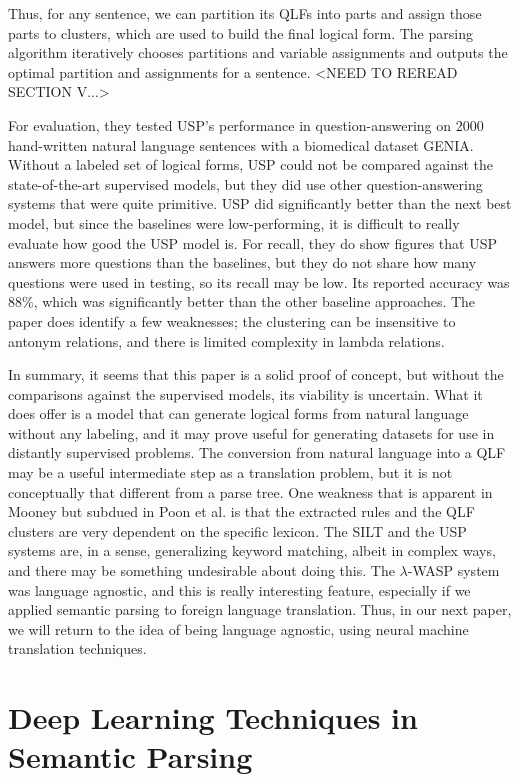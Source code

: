 \documentclass[a4paper]{article}
\theoremstyle{definition}
\begin{document}
\quad Thus, for any sentence, we can partition its QLFs into parts and assign those parts to clusters, which are used to build the final logical form. The parsing algorithm iteratively chooses partitions and variable assignments and outputs the optimal partition and assignments for a sentence. <NEED TO REREAD SECTION V...>

\quad For evaluation, they tested USP's performance in question-answering on $2000$ hand-written natural language sentences with a biomedical dataset GENIA. Without a labeled set of logical forms, USP could not be compared against the state-of-the-art supervised models, but they did use other question-answering systems that were quite primitive. USP did significantly better than the next best model, but since the baselines were low-performing, it is difficult to really evaluate how good the USP model is. For recall, they do show figures that USP answers more questions than the baselines, but they do not share how many questions were used in testing, so its recall may be low. Its reported accuracy was $88\%$, which was significantly better than the other baseline approaches. The paper does identify a few weaknesses; the clustering can be insensitive to antonym relations, and there is limited complexity in lambda relations.

\quad In summary, it seems that this paper is a solid proof of concept, but without the comparisons against the supervised models, its viability is uncertain. What it does offer is a model that can generate logical forms from natural language without any labeling, and it may prove useful for generating datasets for use in distantly supervised problems. The conversion from natural language into a QLF may be a useful intermediate step as a translation problem, but it is not conceptually that different from a parse tree. One weakness that is apparent in Mooney but subdued in Poon et al. is that the extracted rules and the QLF clusters are very dependent on the specific lexicon. The SILT and the USP systems are, in a sense, generalizing keyword matching, albeit in complex ways, and there may be something undesirable about doing this. The $\lambda$-WASP system was language agnostic, and this is really interesting feature, especially if we applied semantic parsing to foreign language translation. Thus, in our next paper, we will return to the idea of being language agnostic, using neural machine translation techniques.

\section{Deep Learning Techniques in Semantic Parsing}
\end{document}
